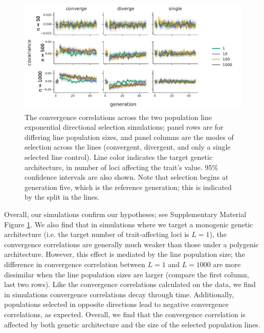 \documentclass[11pt]{article}
\begin{document}
{\begin{figure}[!ht]
  \centering
  \includegraphics[width=\textwidth]{figures/fig-convergence-corrs.pdf}

  \caption{The convergence correlations across the two population line
    exponential directional selection simulations; panel rows are for differing
    line population sizes, and panel columns are the modes of selection across
    the lines (convergent, divergent, and only a single selected line control).
    Line color indicates the target genetic architecture, in number of loci
    affecting the trait's value. 95\% confidence intervals are also shown. Note
    that selection begins at generation five, which is the reference
    generation; this is indicated by the split in the lines.}

  \label{suppfig:convergence-corrs}
\end{figure}

Overall, our simulations confirm our hypotheses; see Supplementary Material
Figure \ref{suppfig:convergence-corrs}. We also find that in simulations where
we target a monogenic genetic architecture (i.e. the target number of
trait-affecting loci is $L=1$), the convergence correlations are generally much
weaker than those under a polygenic architecture. However, this effect is
mediated by the line population size; the difference in convergence correlation
between $L = 1$ and $L = 1000$ are more dissimilar when the line population
sizes are larger (compare the first column, last two rows). Like the
convergence correlations calculated on the \textcite{Barghi2019-qy} data, we
find in simulations convergence correlations decay through time. Additionally,
populations selected in opposite directions lead to negative convergence
correlations, as expected. Overall, we find that the convergence correlation is
affected by both genetic architecture and the size of the selected population
lines.

}
\end{document}
